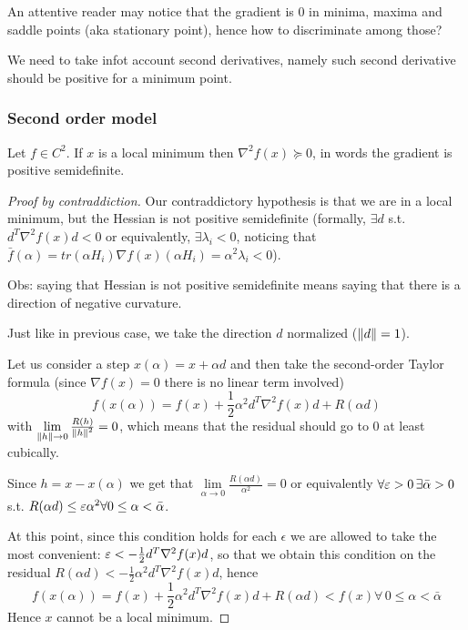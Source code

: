\documentclass[computationalMathematics.tex]{subfiles}
\begin{document}
An attentive reader may notice that the gradient is $0$ in minima, maxima and saddle points (aka stationary point), hence how to discriminate among those?


We need to take infot account second derivatives, namely such second derivative should be positive for a minimum point.

\subsubsection{Second order model}

\begin{proposition}
Let $f \in C^2$. If $x$ is a local minimum then $\nabla^2 f(x) \succeq 0$, in words the gradient is positive semidefinite.
\end{proposition}

\begin{proof}[Proof by contraddiction]
  Our contraddictory hypothesis is that we are in a local minimum, but the Hessian is not positive semidefinite (formally, $\exists d$ s.t.~$d^T \nabla^2 f(x) d < 0$ or equivalently, $\exists \lambda_i <0$, noticing that $\bar{f}(\alpha)  = tr{(\alpha H_i)} \nabla f(x) (\alpha H_i) = \alpha^2 \lambda_i < 0$).
  
  Obs: saying that Hessian is not positive semidefinite means saying that there is a direction of negative curvature.

  Just like in previous case, we take the direction $d$ normalized ($\left\lVert d\right\rVert = 1$).

  Let us consider a step $x(\alpha) = x + \alpha d$ and then take the second-order Taylor formula (since $\nabla f(x) = 0$ there is no linear term involved)
\[
  f(x(\alpha)) = f(x) + \frac{1}{2} \alpha^2 d^T \nabla^2 f(x) d + R( \alpha d )
\]
with $\lim\limits_{\left\lVert h\right\rVert \to 0} \frac{R(h)}{\left\lVert h\right\rVert^2} = 0$, which means that the residual should go to $0$ at least cubically.
  
Since $h = x - x(\alpha)$ we get that $\lim\limits_{\alpha \to 0} \frac{R(\alpha d)}{\alpha^2} = 0$ or equivalently $\forall \varepsilon > 0 \, \exists \bar{\alpha} > 0$ s.t. $R(\alpha d) \leq \varepsilon \alpha^2 \forall 0 \leq \alpha < \bar{\alpha}$.

At this point, since this condition holds for each $\epsilon$ we are allowed to take the most convenient: $\varepsilon < -\frac{1}{2} d^T \nabla^2 f(x) d$, so that we obtain this condition on the residual $R(\alpha d) < -\frac{1}{2} \alpha^2 d^T \nabla^2 f(x) d$, hence
\[
f(x(\alpha)) = f(x) + \frac{1}{2} \alpha^2 d^T \nabla^2 f(x) d + R(\alpha d) < f(x) \forall \, 0 \leq \alpha < \bar{\alpha}
\]
Hence $x$ cannot be a local minimum.
\end{proof}
\end{document}
